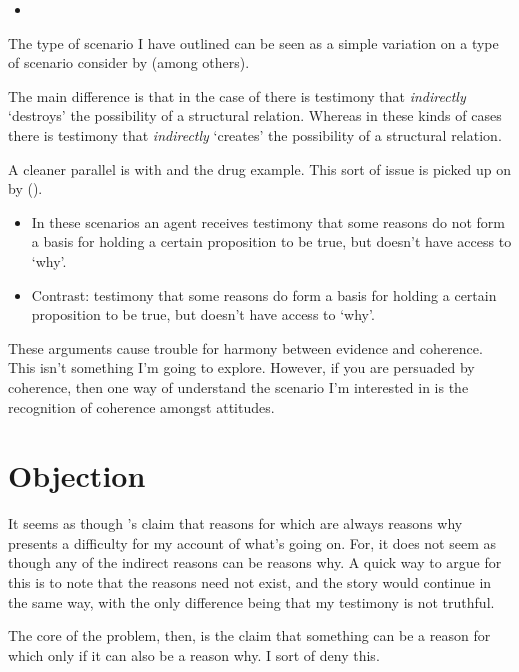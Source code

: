 \documentclass[10pt]{article}
\begin{document}
\begin{itemize}
\item \textcite{Worsnip:2018aa}
\end{itemize}

The type of scenario I have outlined can be seen as a simple variation on a type of scenario consider by \textcite{Worsnip:2018aa} (among others).

The main difference is that in the case of \citeauthor{Worsnip:2018aa} there is testimony that \emph{indirectly} `destroys' the possibility of a structural relation.
Whereas in these kinds of cases there is testimony that \emph{indirectly} `creates' the possibility of a structural relation.

A cleaner parallel is with \cite{Christensen:2007aa} and the drug example.
This sort of issue is picked up on by \citeauthor{Neta:2019aa} (\citeyear[189]{Neta:2019aa}).

\begin{itemize}
\item In these scenarios an agent receives testimony that some reasons do not form a basis for holding a certain proposition to be true, but doesn't have access to `why'.
\item Contrast: testimony that some reasons do form a basis for holding a certain proposition to be true, but doesn't have access to `why'.
\end{itemize}

These arguments cause trouble for harmony between evidence and coherence.
This isn't something I'm going to explore.
However, if you are persuaded by coherence, then one way of understand the scenario I'm interested in is the recognition of coherence amongst attitudes.


\section{Objection}
\label{sec:objection}

It seems as though \citeauthor{Neta:2019aa}'s claim that reasons for which are always reasons why presents a difficulty for my account of what's going on.
For, it does not seem as though any of the indirect reasons can be reasons why.
A quick way to argue for this is to note that the reasons need not exist, and the story would continue in the same way, with the only difference being that my testimony is not truthful.

The core of the problem, then, is the claim that something can be a reason for which only if it can also be a reason why.
I sort of deny this.
\end{document}
